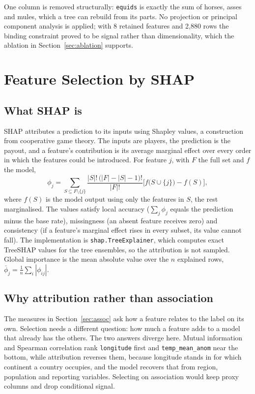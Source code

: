 \documentclass[10pt,openany]{report}
\begin{document}
One column is removed structurally: \texttt{equids} is exactly the sum of horses, asses and mules,
which a tree can rebuild from its parts. No projection or principal component analysis is applied;
with 8 retained features and 2,880 rows the binding constraint proved to be signal rather than
dimensionality, which the ablation in Section~\ref{sec:ablation} supports.

\section{Feature Selection by SHAP}
\label{sec:shapselect}

\subsection*{What SHAP is}

SHAP attributes a prediction to its inputs using Shapley values, a construction from cooperative game
theory. The inputs are players, the prediction is the payout, and a feature's contribution is its
average marginal effect over every order in which the features could be introduced. For feature $j$,
with $F$ the full set and $f$ the model,
\[
\phi_j = \sum_{S \subseteq F \setminus \{j\}}
\frac{|S|!\,\big(|F|-|S|-1\big)!}{|F|!}
\Big[ f\big(S \cup \{j\}\big) - f(S) \Big],
\]
where $f(S)$ is the model output using only the features in $S$, the rest marginalised. The values
satisfy local accuracy ($\sum_j \phi_j$ equals the prediction minus the base rate), missingness (an
absent feature receives zero) and consistency (if a feature's marginal effect rises in every subset,
its value cannot fall). The implementation is \texttt{shap.TreeExplainer}, which computes exact
TreeSHAP values for the tree ensembles, so the attribution is not sampled. Global importance is the
mean absolute value over the $n$ explained rows, $\bar{\phi}_j = \frac{1}{n}\sum_i |\phi_{ij}|$.

\subsection*{Why attribution rather than association}

The measures in Section~\ref{sec:assoc} ask how a feature relates to the label on its own. Selection
needs a different question: how much a feature adds to a model that already has the others. The two
answers diverge here. Mutual information and Spearman correlation rank \texttt{longitude} first and
\texttt{temp\_mean\_anom} near the bottom, while attribution reverses them, because longitude stands in
for which continent a country occupies, and the model recovers that from region, population and
reporting variables. Selecting on association would keep proxy columns and drop conditional signal.
\end{document}
